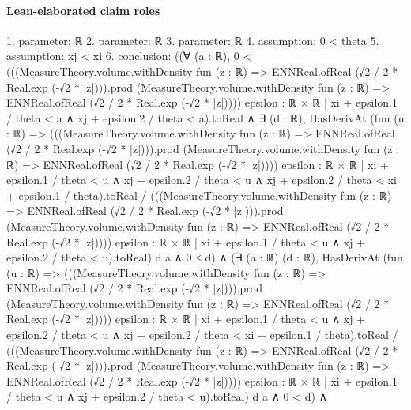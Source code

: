 \documentclass[10pt]{article}
\begin{document}
\paragraph{Lean-elaborated claim roles}\begin{ReviewVerbatim}
1. parameter: ℝ
2. parameter: ℝ
3. parameter: ℝ
4. assumption: 0 < theta
5. assumption: xj < xi
6. conclusion: ((∀ (a : ℝ),
      0 <
          (((MeasureTheory.volume.withDensity fun (z : ℝ) => ENNReal.ofReal (√2 / 2 * Real.exp (-√2 * |z|))).prod
                (MeasureTheory.volume.withDensity fun (z : ℝ) => ENNReal.ofReal (√2 / 2 * Real.exp (-√2 * |z|))))
              {epsilon : ℝ × ℝ | xi + epsilon.1 / theta < a ∧ xj + epsilon.2 / theta < a}).toReal ∧
        ∃ (d : ℝ),
          HasDerivAt
              (fun (u : ℝ) =>
                (((MeasureTheory.volume.withDensity fun (z : ℝ) => ENNReal.ofReal (√2 / 2 * Real.exp (-√2 * |z|))).prod
                        (MeasureTheory.volume.withDensity fun (z : ℝ) =>
                          ENNReal.ofReal (√2 / 2 * Real.exp (-√2 * |z|))))
                      {epsilon : ℝ × ℝ |
                        xi + epsilon.1 / theta < u ∧
                          xj + epsilon.2 / theta < u ∧ xj + epsilon.2 / theta < xi + epsilon.1 / theta}).toReal /
                  (((MeasureTheory.volume.withDensity fun (z : ℝ) =>
                            ENNReal.ofReal (√2 / 2 * Real.exp (-√2 * |z|))).prod
                        (MeasureTheory.volume.withDensity fun (z : ℝ) =>
                          ENNReal.ofReal (√2 / 2 * Real.exp (-√2 * |z|))))
                      {epsilon : ℝ × ℝ | xi + epsilon.1 / theta < u ∧ xj + epsilon.2 / theta < u}).toReal)
              d a ∧
            0 ≤ d) ∧
    (∃ (a : ℝ) (d : ℝ),
        HasDerivAt
            (fun (u : ℝ) =>
              (((MeasureTheory.volume.withDensity fun (z : ℝ) => ENNReal.ofReal (√2 / 2 * Real.exp (-√2 * |z|))).prod
                      (MeasureTheory.volume.withDensity fun (z : ℝ) => ENNReal.ofReal (√2 / 2 * Real.exp (-√2 * |z|))))
                    {epsilon : ℝ × ℝ |
                      xi + epsilon.1 / theta < u ∧
                        xj + epsilon.2 / theta < u ∧ xj + epsilon.2 / theta < xi + epsilon.1 / theta}).toReal /
                (((MeasureTheory.volume.withDensity fun (z : ℝ) => ENNReal.ofReal (√2 / 2 * Real.exp (-√2 * |z|))).prod
                      (MeasureTheory.volume.withDensity fun (z : ℝ) => ENNReal.ofReal (√2 / 2 * Real.exp (-√2 * |z|))))
                    {epsilon : ℝ × ℝ | xi + epsilon.1 / theta < u ∧ xj + epsilon.2 / theta < u}).toReal)
            d a ∧
          0 < d) ∧

\end{ReviewVerbatim}
\end{document}

